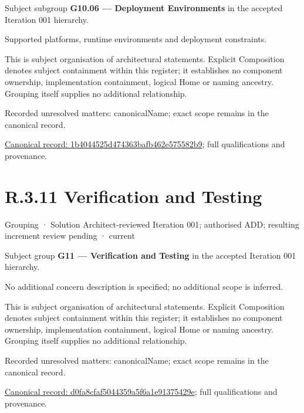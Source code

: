 Subject subgroup \textbf{G10.06 — Deployment Environments} in the accepted Iteration 001 hierarchy.



Supported platforms, runtime environments and deployment constraints.



This is subject organisation of architectural statements. Explicit Composition denotes subject containment within this register; it establishes no component ownership, implementation containment, logical Home or naming ancestry. Grouping itself supplies no additional relationship.


{\small Recorded unresolved matters: canonicalName; exact scope remains in the canonical record.}\par
{\footnotesize \href{../../../../continuum/grouping/1b4044525d474363bafb462e575582b9.md}{Canonical record: 1b4044525d474363bafb462e575582b9}; full qualifications and provenance.}\par
\section*{R.3.11 Verification and Testing}
\label{navigation:R.3.11}

\label{element:d0fa8cfaf5044359a5f6a1e91375429e}
{\small Grouping · Solution Architect-reviewed Iteration 001; authorised ADD; resulting increment review pending · current}\par

Subject group \textbf{G11 — Verification and Testing} in the accepted Iteration 001 hierarchy.



No additional concern description is specified; no additional scope is inferred.



This is subject organisation of architectural statements. Explicit Composition denotes subject containment within this register; it establishes no component ownership, implementation containment, logical Home or naming ancestry. Grouping itself supplies no additional relationship.


{\small Recorded unresolved matters: canonicalName; exact scope remains in the canonical record.}\par
{\footnotesize \href{../../../../continuum/grouping/d0fa8cfaf5044359a5f6a1e91375429e.md}{Canonical record: d0fa8cfaf5044359a5f6a1e91375429e}; full qualifications and provenance.}\par
